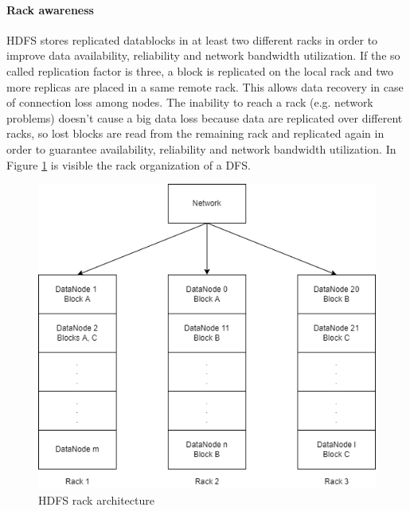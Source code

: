 \documentclass[\main/main.tex]{subfiles}
\begin{document}
\paragraph{Rack awareness} HDFS stores replicated datablocks in at least two different racks in order to improve data availability, reliability and network bandwidth utilization. If the so called replication factor is three, a block is replicated on the local rack and two more replicas are placed in a same remote rack. This allows data recovery in case of connection loss among nodes. The inability to reach a rack (e.g. network problems) doesn't cause a big data loss because data are replicated over different racks, so lost blocks are read from the remaining rack and replicated again in order to guarantee availability, reliability and network bandwidth utilization. In Figure \ref{fig:racks_dfs} is visible the rack organization of a DFS.
\begin{figure}[H]
    \centering
    \includegraphics[scale=.6]{images/cluster_computing/racks_dfs.png}
    \caption{HDFS rack architecture}
    \label{fig:racks_dfs}
\end{figure}
\end{document}
